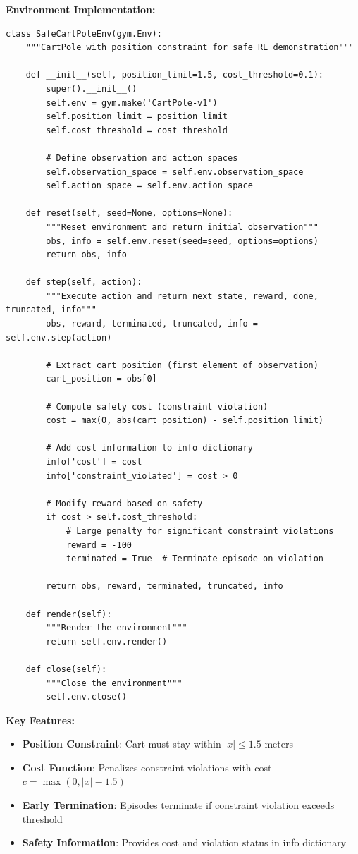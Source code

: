 \documentclass[12pt]{article}
\begin{document}
{{{{\textbf{Environment Implementation:}
\begin{verbatim}
class SafeCartPoleEnv(gym.Env):
    """CartPole with position constraint for safe RL demonstration"""
    
    def __init__(self, position_limit=1.5, cost_threshold=0.1):
        super().__init__()
        self.env = gym.make('CartPole-v1')
        self.position_limit = position_limit
        self.cost_threshold = cost_threshold
        
        # Define observation and action spaces
        self.observation_space = self.env.observation_space
        self.action_space = self.env.action_space
        
    def reset(self, seed=None, options=None):
        """Reset environment and return initial observation"""
        obs, info = self.env.reset(seed=seed, options=options)
        return obs, info
    
    def step(self, action):
        """Execute action and return next state, reward, done, truncated, info"""
        obs, reward, terminated, truncated, info = self.env.step(action)
        
        # Extract cart position (first element of observation)
        cart_position = obs[0]
        
        # Compute safety cost (constraint violation)
        cost = max(0, abs(cart_position) - self.position_limit)
        
        # Add cost information to info dictionary
        info['cost'] = cost
        info['constraint_violated'] = cost > 0
        
        # Modify reward based on safety
        if cost > self.cost_threshold:
            # Large penalty for significant constraint violations
            reward = -100
            terminated = True  # Terminate episode on violation
        
        return obs, reward, terminated, truncated, info
    
    def render(self):
        """Render the environment"""
        return self.env.render()
    
    def close(self):
        """Close the environment"""
        self.env.close()
\end{verbatim}

\textbf{Key Features:}
\begin{itemize}
\item \textbf{Position Constraint}: Cart must stay within $|x| \leq 1.5$ meters
\item \textbf{Cost Function}: Penalizes constraint violations with cost $c = \max(0, |x| - 1.5)$
\item \textbf{Early Termination}: Episodes terminate if constraint violation exceeds threshold
\item \textbf{Safety Information}: Provides cost and violation status in info dictionary
\end{itemize}

}}}}
\end{document}
